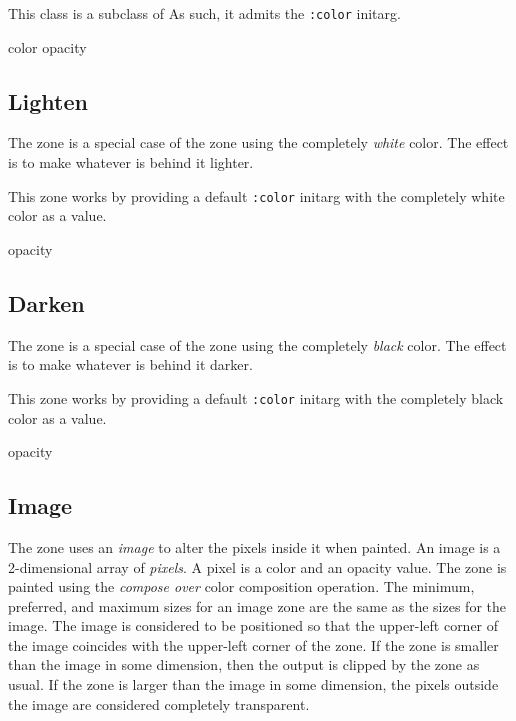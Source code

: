 This class is a subclass of 
  As such, it admits the
\texttt{:color} initarg. 


 {color opacity}

\subsection{Lighten}
\label{sec-zones-graphic-lighten}

The  zone is a special case of the 
zone   using the completely
\emph{white} color.  The effect is to make whatever is behind it
lighter.

This zone works by providing a default \texttt{:color} initarg with
the completely white color as a value. 



 {opacity}

\subsection{Darken}
\label{sec-zones-graphic-darken}

The  zone is a special case of the 
zone   using the completely
\emph{black} color.  The effect is to make whatever is behind it
darker.

This zone works by providing a default \texttt{:color} initarg with
the completely black color as a value. 



 {opacity}

\subsection{Image}
\label{sec-zones-graphic-image}

The  zone uses an \emph{image} to alter the pixels inside
it when painted.  An image is a 2-dimensional array of \emph{pixels}.
A pixel is a color and an opacity value.  The zone is painted using
the \emph{compose over} color composition operation.  The minimum,
preferred, and maximum sizes for an image zone are the same as the
sizes for the image.  The image is considered to be positioned so that
the upper-left corner of the image coincides with the upper-left
corner of the zone.  If the zone is smaller than the image in some
dimension, then the output is clipped by the zone as usual.  If the
zone is larger than the image in some dimension, the pixels outside
the image are considered completely transparent.

